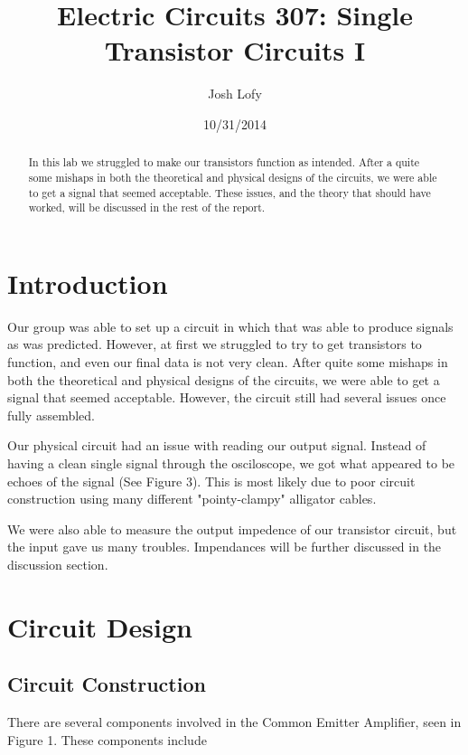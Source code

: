 \documentclass[a4paper]{article}
\title{Electric Circuits 307:
Single Transistor Circuits I}
\author{Josh Lofy}
\date{10/31/2014}
\begin{document}
\maketitle

\begin{abstract}
 In this lab we struggled to make our transistors function as intended.  After a quite some mishaps in both the theoretical and physical designs of the circuits, we were able to get a signal that seemed acceptable.  These issues, and the theory that should have worked, will be discussed in the rest of the report.
\end{abstract}

\section{Introduction}

Our group was able to set up a circuit in which that was able to produce signals as was predicted.  However,  at first we struggled to try to get transistors to function, and even our final data is not very clean.  After quite some mishaps in both the theoretical  and physical designs of the circuits, we were able to get a signal that seemed acceptable.  However, the circuit still had several issues once fully assembled.  

Our physical circuit had an issue with reading our output signal.  Instead of having a clean single signal through the osciloscope, we got what appeared to be echoes of the signal (See Figure 3).  This is most likely due to poor circuit construction using many different "pointy-clampy" alligator cables.

We were also able to measure the output impedence of our transistor circuit, but the input gave us many troubles.  Impendances will be further discussed in the discussion section.

\section{Circuit Design}

\subsection{Circuit Construction}

There are several components involved in the Common Emitter Amplifier, seen in Figure 1.  These components include
\end{document}
